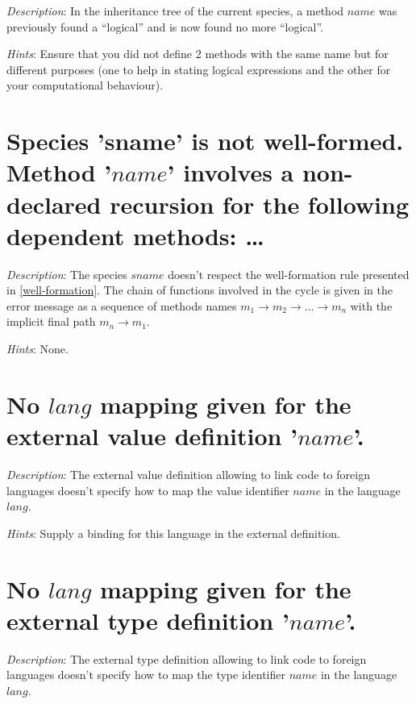 {\em Description}: In the inheritance tree of the current species, a
method $name$ was previously found a ``logical'' and is now found no
more ``logical''.

{\em Hints}: Ensure that you did not define 2 methods with the same
name but for different purposes (one to help in stating logical
expressions and the other for your computational behaviour).



\section*{Species 'sname' is not well-formed. Method  '$name$' involves
  a non-declared recursion for the following dependent methods: \ldots}

{\em Description}: The species $sname$ doesn't respect the
well-formation rule presented in \ref{well-formation}. The chain of
functions involved in the cycle is given in the error message as a
sequence of methods names
$m_1 \rightarrow m_2 \rightarrow \ldots \rightarrow m_n$ with the
implicit final path $m_n \rightarrow m_1$.

{\em Hints}: None.



\section*{No $lang$ mapping given for the external value definition
  '$name$'.}

{\em Description}: The external value definition allowing to link
{\focal} code to foreign languages doesn't specify how to map the value
identifier $name$ in the language $lang$.

{\em Hints}: Supply a binding for this language in the external
definition.



\section*{No $lang$ mapping given for the external type definition
  '$name$'.}

{\em Description}: The external type definition allowing to link
{\focal} code to foreign languages doesn't specify how to map the type
identifier $name$ in the language $lang$.

